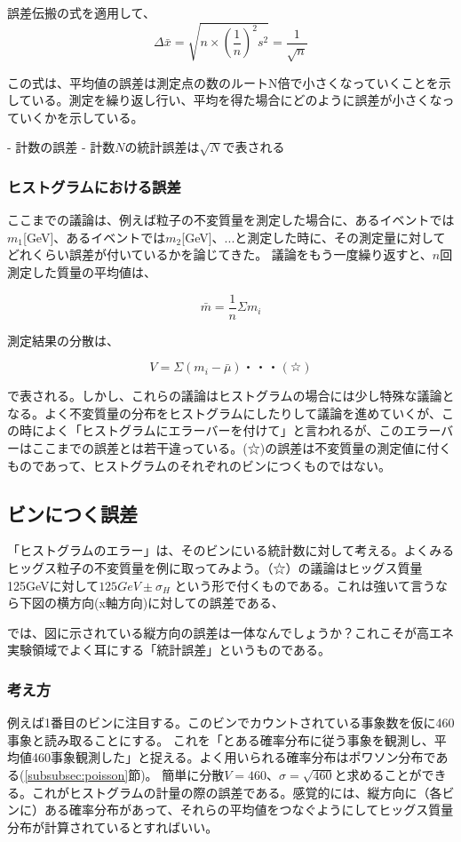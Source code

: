誤差伝搬の式を適用して、
\begin{equation}
  \Delta \bar{x} = \sqrt{n\times\left(\frac{1}{n}\right)^2s^2}=\frac{1}{\sqrt{n}}
\end{equation}

この式は、平均値の誤差は測定点の数のルートN倍で小さくなっていくことを示している。測定を繰り返し行い、平均を得た場合にどのように誤差が小さくなっていくかを示している。

- 計数の誤差
- 計数$N$の統計誤差は$\sqrt{N}$で表される

\subsubsection{ヒストグラムにおける誤差}
ここまでの議論は、例えば粒子の不変質量を測定した場合に、あるイベントでは$m_1$[GeV]、あるイベントでは$m_2$[GeV]、...と測定した時に、その測定量に対してどれくらい誤差が付いているかを論じてきた。
議論をもう一度繰り返すと、$n$回測定した質量の平均値は、

\begin{equation}
  \bar{m}=\frac{1}{n}\Sigma m_i
\end{equation}

測定結果の分散は、

\begin{equation}
  V=\Sigma(m_i-\bar{\mu})・・・(☆)
\end{equation}

で表される。しかし、これらの議論はヒストグラムの場合には少し特殊な議論となる。よく不変質量の分布をヒストグラムにしたりして議論を進めていくが、この時によく「ヒストグラムにエラーバーを付けて」と言われるが、このエラーバーはここまでの誤差とは若干違っている。(☆)の誤差は不変質量の測定値に付くものであって、ヒストグラムのそれぞれのビンにつくものではない。

\subsection{ビンにつく誤差}
「ヒストグラムのエラー」は、そのビンにいる統計数に対して考える。よくみるヒッグス粒子の不変質量を例に取ってみよう。（☆）の議論はヒッグス質量125GeVに対して$125GeV \pm \sigma_{H}$ という形で付くものである。これは強いて言うなら下図の横方向(x軸方向)に対しての誤差である、

では、図に示されている縦方向の誤差は一体なんでしょうか？これこそが高エネ実験領域でよく耳にする「統計誤差」というものである。

\subsubsection{考え方}
例えば1番目のビンに注目する。このビンでカウントされている事象数を仮に460事象と読み取ることにする。
これを「とある確率分布に従う事象を観測し、平均値460事象観測した」と捉える。よく用いられる確率分布はポワソン分布である(\ref{subsubsec:poisson}節)。
簡単に分散$V=460$、$\sigma=\sqrt{460}$と求めることができる。これがヒストグラムの計量の際の誤差である。感覚的には、縦方向に（各ビンに）ある確率分布があって、それらの平均値をつなぐようにしてヒッグス質量分布が計算されているとすればいい。

